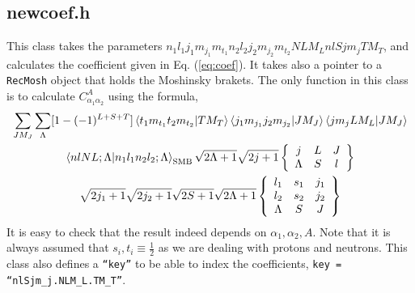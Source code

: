 \documentclass[10pt]{article}
\begin{document}
\subsection{newcoef.h}
This class takes the parameters $n_1 l_1 j_1 m_{j_1} m_{t_1} n_2 l_2 j_2 m_{j_2} m_{t_2} N L M_L n l S j m_j T M_T$, and calculates the coefficient given in Eq. (\ref{eq:coef}). It takes also a pointer to a \texttt{RecMosh} object that holds the Moshinsky brakets. The only function in this class is to calculate $C_{\alpha_1 \alpha_2}^{A}$ using the formula,
\begin{multline}
	\sum_{J M_J} \sum_{\Lambda} 
	[ 1 - (-1)^{L+S+T}] \braket{ t_1 m_{t_1} t_2 m_{t_2} | T M_T }
	\braket{ j_1 m_{j_1} j_2 m_{j_2} | J M_J}
	\braket{ j m_j L M_L | J M_J } \\
	\braket{ n l N L; \Lambda | n_1 l_1 n_2 l_2 ; \Lambda}_{\textrm{SMB}}
	\sqrt{2 \Lambda + 1} \sqrt{ 2j+1}
	\left\{
	\begin{array}{ccc}
		j & L & J \\
		\Lambda & S & l
	\end{array}
	\right\} \\
	\sqrt{2j_1 + 1} \sqrt{2j_2 + 1} \sqrt{ 2S + 1} \sqrt{ 2 \Lambda + 1}
	\left\{
	\begin{array}{ccc}
		l_1 & s_1 & j_1 \\
		l_2 & s_2 & j_2 \\
		\Lambda & S & J \\
	\end{array}
	\right\}
\end{multline}
It is easy to check that the result indeed depends on $\alpha_1, \alpha_2, A$. Note that it is always assumed that $s_i,t_i \equiv \frac{1}{2}$ as we are dealing with protons and neutrons.
This class also defines a \texttt{``key''} to be able to index the coefficients, \texttt{key = ``nlSjm\_j.NLM\_L.TM\_T''}.
\end{document}
